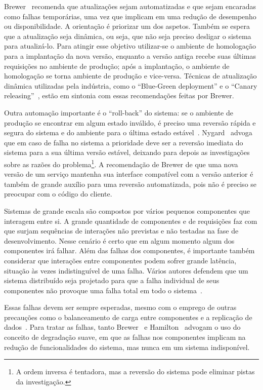Brewer~\cite{Brewer2001GiantScale} recomenda que atualizações sejam automatizadas e que sejam encaradas como falhas temporárias, uma vez que implicam em uma redução de desempenho ou disponibilidade. A orientação é priorizar um dos aspetos. Também se espera que a atualização seja dinâmica, ou seja, que não seja preciso desligar o sistema para atualizá-lo. Para atingir esse objetivo utilizar-se o ambiente de homologação para a implantação da nova versão, enquanto a versão antiga recebe suas últimas requisições no ambiente de produção; após a implantação, o ambiente de homologação se torna ambiente de produção e vice-versa. Técnicas de atualização dinâmica utilizadas pela indústria, como o ``Blue-Green deployment'' e o ``Canary releasing''~\cite{Humble2011Continuous}, estão em sintonia com essas recomendações feitas por Brewer.

Outra automação importante é o ``roll-back'' do sistema: se o ambiente de produção se encontrar em algum estado inválido, é preciso uma reversão rápida e segura do sistema e do ambiente para o última estado estável~\cite{Hamilton2007InternetScale, Brewer2001GiantScale}. Nygard~\cite{Nygard2009Release} advoga que em caso de falha no sistema a prioridade deve ser a reversão imediata do sistema para a sua última versão estável, deixando para depois as investigações sobre as razões do problema\footnote{A ordem inversa é tentadora, mas a reversão do sistema pode eliminar pistas da investigação.}. A recomendação de Brewer de que uma nova versão de um serviço mantenha sua interface compatível com a versão anterior é também de grande auxílio para uma reversão automatizada, pois não é preciso se preocupar com o código do cliente.

Sistemas de grande escala são compostos por vários pequenos componentes que interagem entre si. A grande quantidade de componentes e de requisições faz com que surjam sequências de interações não previstas e não testadas na fase de desenvolvimento. Nesse cenário é certo que em algum momento algum dos componentes irá falhar. Além das falhas dos componentes, é importante também considerar que interações entre componentes podem sofrer grande latência, situação às vezes indistinguível de uma falha. Vários autores defendem que um sistema distribuído seja projetado para que a falha individual de seus componentes não provoque uma falha total em todo o sistema~\cite{Hamilton2007InternetScale, Helland2009Quicksand, Nygard2009Release, CarnegieMellon2006ULS}. 

Essas falhas devem ser sempre esperadas, mesmo com o emprego de outras precauções como o balanceamento de carga entre componentes e a replicação de dados~\cite{Brewer2001GiantScale}. Para tratar as falhas, tanto Brewer~\cite{Brewer2001GiantScale} e Hamilton~\cite{Hamilton2007InternetScale} advogam o uso do conceito de \emph{}degradação suave\emph{}, em que as falhas nos componentes implicam na redução de funcionalidades do sistema, mas nunca em um sistema indisponível.

